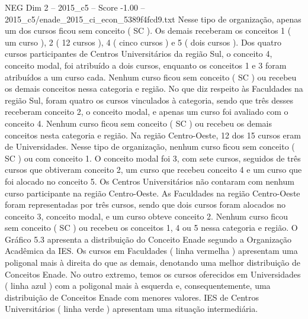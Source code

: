 \begin{textsample}{NEG Dim 2 – 2015\_c5 – Score -1.00 – 2015\_c5/enade\_2015\_ci\_econ\_5389f4fcd9.txt}
Nesse tipo de organização, apenas um dos cursos ficou sem conceito ( SC ).
Os demais receberam os conceitos 1 ( um curso ), 2 ( 12 cursos ), 4 ( cinco cursos ) e 5 ( dois cursos ).
Dos quatro cursos participantes de Centros Universitários da região Sul, o conceito 4, conceito modal, foi atribuído a dois cursos, enquanto os conceitos 1 e 3 foram atribuídos a um curso cada.
Nenhum curso ficou sem conceito ( SC ) ou recebeu os demais conceitos nessa categoria e região.
No que diz respeito às Faculdades na região Sul, foram quatro os cursos vinculados à categoria, sendo que três desses receberam conceito 2, o conceito modal, e apenas um curso foi avaliado com o conceito 4.
Nenhum curso ficou sem conceito ( SC ) ou recebeu os demais conceitos nesta categoria e região.
Na região Centro-Oeste, 12 dos 15 cursos eram de Universidades.
Nesse tipo de organização, nenhum curso ficou sem conceito ( SC ) ou com conceito 1.
O conceito modal foi 3, com sete cursos, seguidos de três cursos que obtiveram conceito 2, um curso que recebeu conceito 4 e um curso que foi alocado no conceito 5.
Os Centros Universitários não contaram com nenhum curso participante na região Centro-Oeste.
As Faculdades na região Centro-Oeste foram representadas por três cursos, sendo que dois cursos foram alocados no conceito 3, conceito modal, e um curso obteve conceito 2.
Nenhum curso ficou sem conceito ( SC ) ou recebeu os conceitos 1, 4 ou 5 nessa categoria e região.
O Gráfico 5.3 apresenta a distribuição do Conceito Enade segundo a Organização Acadêmica da IES.
Os cursos em Faculdades ( linha vermelha ) apresentam uma poligonal mais à direita do que as demais, denotando uma melhor distribuição de Conceitos Enade.
No outro extremo, temos os cursos oferecidos em Universidades ( linha azul ) com a poligonal mais à esquerda e, consequentemente, uma distribuição de Conceitos Enade com menores valores.
IES de Centros Universitários ( linha verde ) apresentam uma situação intermediária.

\end{textsample}
